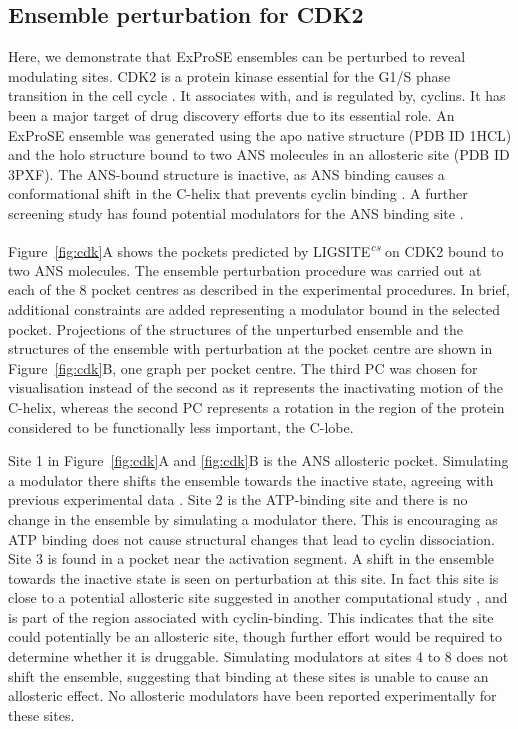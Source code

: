 \subsection{Ensemble perturbation for CDK2}

Here, we demonstrate that ExProSE ensembles can be perturbed to reveal modulating sites.
CDK2 is a protein kinase essential for the G1/S phase transition in the cell cycle \cite{Peyressatre2015}.
It associates with, and is regulated by, cyclins.
It has been a major target of drug discovery efforts due to its essential role.
An ExProSE ensemble was generated using the apo native structure (PDB ID 1HCL) and the holo structure bound to two ANS molecules in an allosteric site (PDB ID 3PXF).
The ANS-bound structure is inactive, as ANS binding causes a conformational shift in the C-helix that prevents cyclin binding \cite{Betzi2011}.
A further screening study has found potential modulators for the ANS binding site \cite{Rastelli2014}.

Figure~\ref{fig:cdk}A shows the pockets predicted by LIGSITE\textsuperscript{\it cs} \cite{Huang2006} on CDK2 bound to two ANS molecules.
The ensemble perturbation procedure was carried out at each of the 8 pocket centres as described in the experimental procedures.
In brief, additional constraints are added representing a modulator bound in the selected pocket.
Projections of the structures of the unperturbed ensemble and the structures of the ensemble with perturbation at the pocket centre are shown in Figure~\ref{fig:cdk}B, one graph per pocket centre.
The third PC was chosen for visualisation instead of the second as it represents the inactivating motion of the C-helix, whereas the second PC represents a rotation in the region of the protein considered to be functionally less important, the C-lobe.

Site 1 in Figure~\ref{fig:cdk}A and \ref{fig:cdk}B is the ANS allosteric pocket.
Simulating a modulator there shifts the ensemble towards the inactive state, agreeing with previous experimental data \cite{Betzi2011}.
Site 2 is the ATP-binding site and there is no change in the ensemble by simulating a modulator there.
This is encouraging as ATP binding does not cause structural changes that lead to cyclin dissociation.
Site 3 is found in a pocket near the activation segment.
A shift in the ensemble towards the inactive state is seen on perturbation at this site.
In fact this site is close to a potential allosteric site suggested in another computational study \cite{Pitt2014}, and is part of the region associated with cyclin-binding.
This indicates that the site could potentially be an allosteric site, though further effort would be required to determine whether it is druggable.
Simulating modulators at sites 4 to 8 does not shift the ensemble, suggesting that binding at these sites is unable to cause an allosteric effect.
No allosteric modulators have been reported experimentally for these sites.


